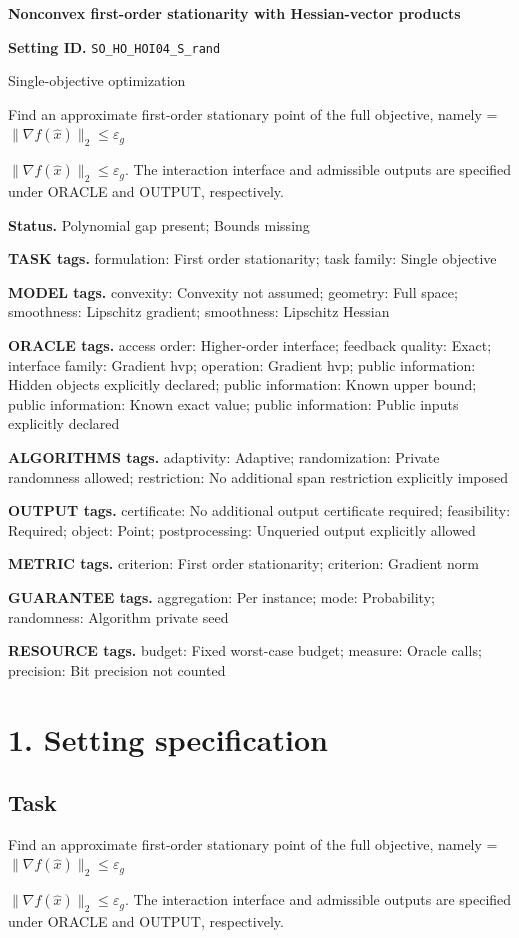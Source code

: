 \documentclass[10pt,a4paper]{article}
\newcommand{\AtlasMath}[1]{\par\begingroup\centering\setbox0=\hbox{$\displaystyle #1$}\ifdim\wd0>1.4\linewidth\typeout{ATLAS WIDE FORMULA: \the\wd0}\fi\ifdim\wd0>\linewidth\resizebox{\linewidth}{!}{\box0}\else\box0\fi\par\endgroup}
\newcommand{\AtlasInlineMath}[1]{\begingroup\setbox0=\hbox{$#1$}\ifdim\wd0>.4\linewidth\endgroup\AtlasMath{#1}\else\endgroup$#1$\fi}
\begin{document}
\raggedright

{\LARGE\bfseries\sffamily\color{AtlasNavy} Nonconvex first-order stationarity with Hessian-vector products\par}\vspace{5pt}
\textbf{Setting ID.} \texttt{SO\_\allowbreak{}HO\_\allowbreak{}HOI04\_\allowbreak{}S\_\allowbreak{}rand}

Single-objective optimization

Find an approximate first-order stationary point of the full objective, namely \AtlasInlineMath{\|\nabla f(\widehat{x})\|_2\le\varepsilon_g}. The interaction interface and admissible outputs are specified under ORACLE and OUTPUT, respectively.

\textbf{Status.} Polynomial gap present; Bounds missing

\textbf{TASK tags.} formulation: First order stationarity; task family: Single objective

\textbf{MODEL tags.} convexity: Convexity not assumed; geometry: Full space; smoothness: Lipschitz gradient; smoothness: Lipschitz Hessian

\textbf{ORACLE tags.} access order: Higher-order interface; feedback quality: Exact; interface family: Gradient hvp; operation: Gradient hvp; public information: Hidden objects explicitly declared; public information: Known upper bound; public information: Known exact value; public information: Public inputs explicitly declared

\textbf{ALGORITHMS tags.} adaptivity: Adaptive; randomization: Private randomness allowed; restriction: No additional span restriction explicitly imposed

\textbf{OUTPUT tags.} certificate: No additional output certificate required; feasibility: Required; object: Point; postprocessing: Unqueried output explicitly allowed

\textbf{METRIC tags.} criterion: First order stationarity; criterion: Gradient norm

\textbf{GUARANTEE tags.} aggregation: Per instance; mode: Probability; randomness: Algorithm private seed

\textbf{RESOURCE tags.} budget: Fixed worst-case budget; measure: Oracle calls; precision: Bit precision not counted

\section{1. Setting specification}
\subsection{Task}
Find an approximate first-order stationary point of the full objective, namely \AtlasInlineMath{\|\nabla f(\widehat{x})\|_2\le\varepsilon_g}. The interaction interface and admissible outputs are specified under ORACLE and OUTPUT, respectively.
\end{document}
